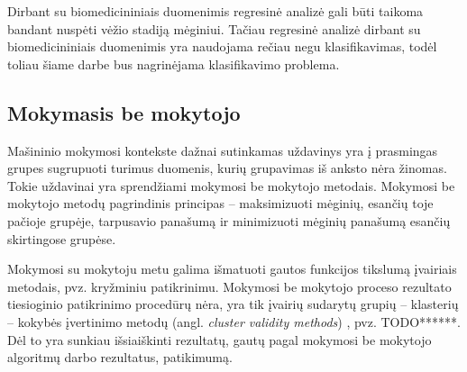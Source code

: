 Dirbant su biomedicininiais duomenimis regresinė analizė gali būti taikoma bandant nuspėti vėžio stadiją mėginiui. Tačiau regresinė analizė dirbant su biomedicininiais duomenimis yra naudojama rečiau negu klasifikavimas, todėl toliau šiame darbe bus nagrinėjama klasifikavimo problema.

\subsection{Mokymasis be mokytojo}

Mašininio mokymosi kontekste dažnai sutinkamas uždavinys yra į prasmingas grupes sugrupuoti turimus duomenis, kurių grupavimas iš anksto nėra žinomas. Tokie uždavinai yra sprendžiami mokymosi be mokytojo metodais. Mokymosi be mokytojo metodų pagrindinis principas -- maksimizuoti mėginių, esančių toje pačioje grupėje, tarpusavio panašumą ir minimizuoti mėginių panašumą esančių skirtingose grupėse.

Mokymosi su mokytoju metu galima išmatuoti gautos funkcijos tikslumą įvairiais metodais, pvz. kryžminiu patikrinimu. Mokymosi be mokytojo proceso rezultato tiesioginio patikrinimo procedūrų nėra, yra tik įvairių sudarytų grupių -- klasterių -- kokybės įvertinimo metodų (angl. \textit{cluster validity methods}) \cite{journals/sigmod/HalkidiBV02}, pvz. TODO******. Dėl to yra sunkiau išsiaiškinti rezultatų, gautų pagal mokymosi be mokytojo algoritmų darbo rezultatus, patikimumą. 


